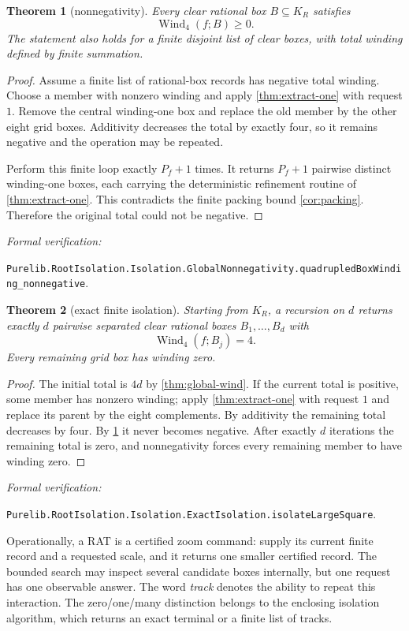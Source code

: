 \documentclass[11pt]{article}
\newtheorem{theorem}{Theorem}[section]
\newcommand{\Wind}{\operatorname{Wind}}
\newcommand{\leanref}[1]{\par\smallskip\noindent
  \emph{Formal verification:}\par\nobreak
  {\raggedright\nolinkurl{#1}.\par}}
\begin{document}
\begin{theorem}[nonnegativity]
\label{thm:nonnegative}
Every clear rational box $B\subseteq K_R$ satisfies
\[
             \Wind_4(f;B)\ge0.
\]
The statement also holds for a finite disjoint list of clear boxes, with
total winding defined by finite summation.
\end{theorem}

\begin{proof}
Assume a finite list of rational-box records has negative total winding.
Choose a member
with nonzero winding and apply \cref{thm:extract-one} with request $1$.
Remove the central winding-one box and replace the old member by the
other eight grid boxes.  Additivity decreases the total by exactly four,
so it remains negative and the operation may be repeated.

Perform this finite loop exactly $P_f+1$ times.  It returns $P_f+1$ pairwise distinct winding-one boxes, each carrying the deterministic refinement routine of \cref{thm:extract-one}.  This contradicts the finite packing bound \cref{cor:packing}.  Therefore the original total could not be negative.
\end{proof}

\leanref{Purelib.RootIsolation.Isolation.GlobalNonnegativity.quadrupledBoxWinding_nonnegative}

\begin{theorem}[exact finite isolation]
\label{thm:isolation}
Starting from $K_R$, a recursion on $d$ returns exactly $d$ pairwise separated clear rational boxes $B_1,\dots,B_d$ with
\[
       \Wind_4(f;B_j)=4.
\]
Every remaining grid box has winding zero.
\end{theorem}

\begin{proof}
The initial total is $4d$ by \cref{thm:global-wind}.  If the current
total is positive, some member has nonzero winding; apply
\cref{thm:extract-one} with request $1$ and replace its parent by the eight
complements.  By additivity the remaining total decreases by four.  By
\cref{thm:nonnegative} it never becomes negative.  After exactly $d$
iterations the remaining total is zero, and nonnegativity forces every
remaining member to have winding zero.
\end{proof}

\leanref{Purelib.RootIsolation.Isolation.ExactIsolation.isolateLargeSquare}

Operationally, a RAT is a certified zoom command: supply its current finite
record and a requested scale, and it returns one smaller certified record.
The bounded search may inspect several candidate boxes internally, but one
request has one observable answer.  The word \emph{track} denotes the ability
to repeat this interaction.  The zero/one/many distinction belongs to the
enclosing isolation algorithm, which returns an exact terminal or a finite
list of tracks.
\end{document}
